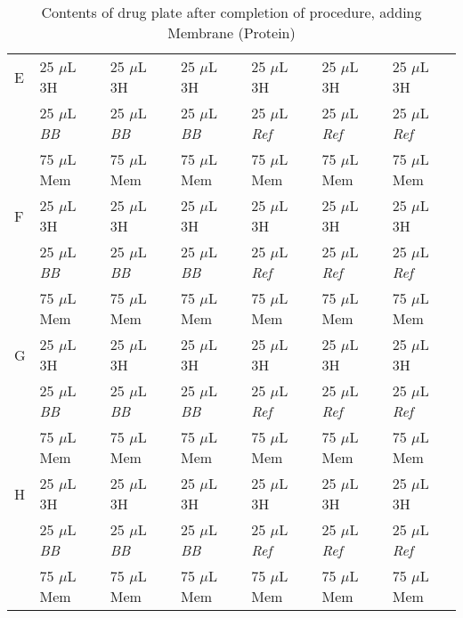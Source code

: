 \documentclass[12pt, letterpaper]{article}
\begin{document}
\begin{table}[h]
\begin{center}
\begin{tabular}{|l|lll|lll|}
        E & 25 $\mu$L 3H        & 25 $\mu$L 3H        & 25 $\mu$L 3H        & 25 $\mu$L 3H         & 25 $\mu$L 3H         & 25 $\mu$L 3H         \\
        & 25 $\mu$L \emph{BB} & 25 $\mu$L \emph{BB} & 25 $\mu$L \emph{BB} & 25 $\mu$L \emph{Ref} & 25 $\mu$L \emph{Ref} & 25 $\mu$L \emph{Ref} \\
        & 75 $\mu$L Mem       & 75 $\mu$L Mem       & 75 $\mu$L Mem       & 75 $\mu$L Mem        & 75 $\mu$L Mem        & 75 $\mu$L Mem        \\ \hline
        F & 25 $\mu$L 3H        & 25 $\mu$L 3H        & 25 $\mu$L 3H        & 25 $\mu$L 3H         & 25 $\mu$L 3H         & 25 $\mu$L 3H         \\
        & 25 $\mu$L \emph{BB} & 25 $\mu$L \emph{BB} & 25 $\mu$L \emph{BB} & 25 $\mu$L \emph{Ref} & 25 $\mu$L \emph{Ref} & 25 $\mu$L \emph{Ref} \\
        & 75 $\mu$L Mem       & 75 $\mu$L Mem       & 75 $\mu$L Mem       & 75 $\mu$L Mem        & 75 $\mu$L Mem        & 75 $\mu$L Mem        \\ \hline
        G & 25 $\mu$L 3H        & 25 $\mu$L 3H        & 25 $\mu$L 3H        & 25 $\mu$L 3H         & 25 $\mu$L 3H         & 25 $\mu$L 3H         \\
        & 25 $\mu$L \emph{BB} & 25 $\mu$L \emph{BB} & 25 $\mu$L \emph{BB} & 25 $\mu$L \emph{Ref} & 25 $\mu$L \emph{Ref} & 25 $\mu$L \emph{Ref} \\
        & 75 $\mu$L Mem       & 75 $\mu$L Mem       & 75 $\mu$L Mem       & 75 $\mu$L Mem        & 75 $\mu$L Mem        & 75 $\mu$L Mem        \\ \hline
        H & 25 $\mu$L 3H        & 25 $\mu$L 3H        & 25 $\mu$L 3H        & 25 $\mu$L 3H         & 25 $\mu$L 3H         & 25 $\mu$L 3H         \\
        & 25 $\mu$L \emph{BB} & 25 $\mu$L \emph{BB} & 25 $\mu$L \emph{BB} & 25 $\mu$L \emph{Ref} & 25 $\mu$L \emph{Ref} & 25 $\mu$L \emph{Ref} \\
        & 75 $\mu$L Mem       & 75 $\mu$L Mem       & 75 $\mu$L Mem       & 75 $\mu$L Mem        & 75 $\mu$L Mem        & 75 $\mu$L Mem        \\ \hline
        \end{tabular}
    \caption{Contents of drug plate after completion of procedure, adding Membrane (Protein)}\label{tab:completedrugplate}
    \end{center}
\end{table}
\end{document}
